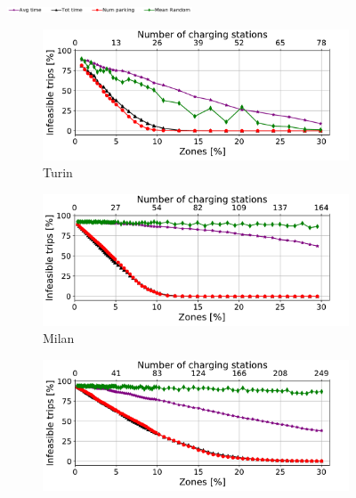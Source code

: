 \begin{figure}[t!]
    \begin{center}
       \includegraphics[width=0.49\textwidth]{figures/legenda2.pdf}
    \end{center}
    \begin{center}
        \begin{subfigure}{0.49\textwidth}
            \includegraphics[width=\columnwidth]{figures/Torino_zonesVsDeaths_algorithms_acs-4_tt-25_policy-FreeFloating.pdf}
            \caption{Turin}
            \label{fig:zone_vs_deaths_torino}
        \end{subfigure}
         \begin{subfigure}{0.49\textwidth}
             \includegraphics[width=\columnwidth]{figures/Milano_zonesVsDeaths_algorithms_acs-4_tt-25_policy-FreeFloating.pdf}
             \caption{Milan}
             \label{fig:zone_vs_deaths_milano}
         \end{subfigure}
         \begin{subfigure}{0.49\textwidth}
             \includegraphics[width=\columnwidth]{figures/Berlino_zonesVsDeaths_algorithms_acs-4_tt-25_policy-FreeFloating.pdf}

\end{subfigure}
\end{center}
\end{figure}
